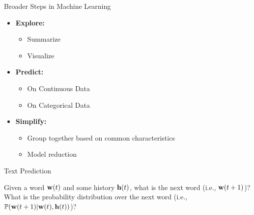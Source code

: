 \documentclass[aspectratio=169,xcolor=dvipsnames,svgnames,x11names,fleqn]{beamer}
\begin{document}
\begin{frame}{Broader Steps in Machine Learning}

\begin{itemize}
    \item \textbf{Explore: }
        \begin{itemize}
            \item Summarize
            \item Visualize
        \end{itemize}
    \item \textbf{Predict: }
    \begin{itemize}
        \item On Continuous Data
        \item On Categorical Data
    \end{itemize}
    \item \textbf{Simplify: }
    \begin{itemize}
        \item Group together based on common characteristics
        \item Model reduction
    \end{itemize}
    
\end{itemize}

\end{frame}



\begin{frame}{Text Prediction}
  \begin{center}\Large
    Given a word ${\mathbf w}(t)$ and some history ${\mathbf h}(t)$, what is the next word 
      (i.e., ${\mathbf w}(t+1)$)? What is the probability distribution over the next 
      word (i.e., ${\mathbb P}({\mathbf w}(t+1)|{\mathbf w}(t),{\mathbf h}(t))$)? \\
    \vspace{1em}
    
     \\
  \end{center}
\end{frame}
\end{document}
